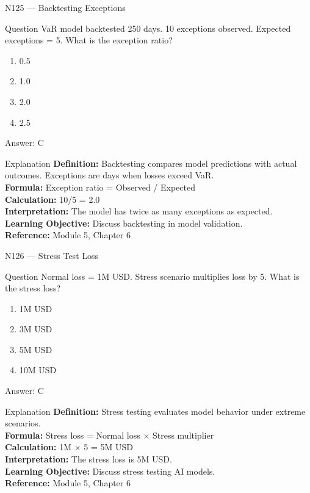 \documentclass[aspectratio=169,8pt]{beamer}
\begin{document}
	\begin{frame}{N125 --- Backtesting Exceptions}
		\begin{block}{Question}
			VaR model backtested 250 days. 10 exceptions observed. Expected exceptions = 5. What is the exception ratio?
			\begin{enumerate}
				\item 0.5
				\item 1.0
				\item 2.0
				\item 2.5
			\end{enumerate}
		\end{block}
		\begin{exampleblock}{Answer: C}\end{exampleblock}
		\begin{block}{Explanation}
			\textbf{Definition:} Backtesting compares model predictions with actual outcomes. Exceptions are days when losses exceed VaR.\\
			\textbf{Formula:} Exception ratio = Observed / Expected\\
			\textbf{Calculation:} 10/5 = 2.0\\
			\textbf{Interpretation:} The model has twice as many exceptions as expected.\\
			\textbf{Learning Objective:} Discuss backtesting in model validation.\\
			\textbf{Reference:} Module 5, Chapter 6
		\end{block}
	\end{frame}
	
	\begin{frame}{N126 --- Stress Test Loss}
		\begin{block}{Question}
			Normal loss = 1M USD. Stress scenario multiplies loss by 5. What is the stress loss?
			\begin{enumerate}
				\item 1M USD
				\item 3M USD
				\item 5M USD
				\item 10M USD
			\end{enumerate}
		\end{block}
		\begin{exampleblock}{Answer: C}\end{exampleblock}
		\begin{block}{Explanation}
			\textbf{Definition:} Stress testing evaluates model behavior under extreme scenarios.\\
			\textbf{Formula:} Stress loss = Normal loss $\times$ Stress multiplier\\
			\textbf{Calculation:} 1M $\times$ 5 = 5M USD\\
			\textbf{Interpretation:} The stress loss is 5M USD.\\
			\textbf{Learning Objective:} Discuss stress testing AI models.\\
			\textbf{Reference:} Module 5, Chapter 6
		\end{block}
	\end{frame}
	
\end{document}
